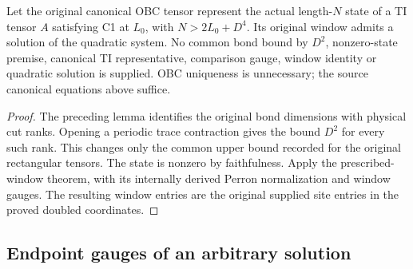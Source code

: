 \begin{lemma}
    \label{lem:quadratic_original_canonical_obc_window}
    \leanok
    Let the original canonical OBC tensor represent the actual
    length-$N$ state of a TI tensor $A$ satisfying C1 at $L_0$, with
    $N>2L_0+D^4$. Its original window admits a solution of the
    quadratic system. No common bond bound by $D^2$, nonzero-state
    premise, canonical TI representative, comparison gauge, window
    identity or quadratic solution is supplied. OBC uniqueness is
    unnecessary; the source canonical equations above suffice.
\end{lemma}
\begin{proof}
    \leanok
    The preceding lemma identifies the original bond dimensions
    with physical cut ranks. Opening a periodic trace contraction
    gives the bound $D^2$ for every such rank. This changes only the
    common upper bound recorded for the original rectangular tensors.
    The state is nonzero by faithfulness. Apply the prescribed-window
    theorem, with its internally derived Perron normalization and
    window gauges. The resulting window entries are the original
    supplied site entries in the proved doubled coordinates.
\end{proof}

\subsection{Endpoint gauges of an arbitrary solution}
\label{sec:quadratic_endpoint_gauges}

